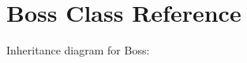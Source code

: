\hypertarget{classBoss}{}\section{Boss Class Reference}
\label{classBoss}


Inheritance diagram for Boss\+:
